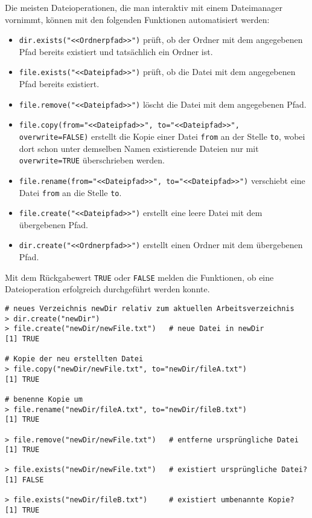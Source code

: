Die meisten Dateioperationen, die man interaktiv mit einem Dateimanager vornimmt, können mit den folgenden Funktionen automatisiert werden:
\begin{itemize}
\item \lstinline!dir.exists("<<Ordnerpfad>>")! prüft, ob der Ordner mit dem angegebenen Pfad bereits existiert und tatsächlich ein Ordner ist.
\item \lstinline!file.exists("<<Dateipfad>>")! prüft, ob die Datei mit dem angegebenen Pfad bereits existiert.
\item \lstinline!file.remove("<<Dateipfad>>")! löscht die Datei mit dem angegebenen Pfad.
\item \lstinline!file.copy(from="<<Dateipfad>>", to="<<Dateipfad>>", overwrite=FALSE)! erstellt die Kopie einer Datei \lstinline!from! an der Stelle \lstinline!to!, wobei dort schon unter demselben Namen existierende Dateien nur mit \lstinline!overwrite=TRUE! überschrieben werden.
\item \lstinline!file.rename(from="<<Dateipfad>>", to="<<Dateipfad>>")! verschiebt eine Datei \lstinline!from! an die Stelle \lstinline!to!.
\item \lstinline!file.create("<<Dateipfad>>")! erstellt eine leere Datei mit dem übergebenen Pfad.
\item \lstinline!dir.create("<<Ordnerpfad>>")! erstellt einen Ordner mit dem übergebenen Pfad.
\end{itemize}

Mit dem Rückgabewert \lstinline!TRUE! oder \lstinline!FALSE! melden die Funktionen, ob eine Dateioperation erfolgreich durchgeführt werden konnte.
\begin{lstlisting}
# neues Verzeichnis newDir relativ zum aktuellen Arbeitsverzeichnis
> dir.create("newDir")
> file.create("newDir/newFile.txt")   # neue Datei in newDir
[1] TRUE

# Kopie der neu erstellten Datei
> file.copy("newDir/newFile.txt", to="newDir/fileA.txt")
[1] TRUE

# benenne Kopie um
> file.rename("newDir/fileA.txt", to="newDir/fileB.txt")
[1] TRUE

> file.remove("newDir/newFile.txt")   # entferne ursprüngliche Datei
[1] TRUE

> file.exists("newDir/newFile.txt")   # existiert ursprüngliche Datei?
[1] FALSE

> file.exists("newDir/fileB.txt")     # existiert umbenannte Kopie?
[1] TRUE
\end{lstlisting}

